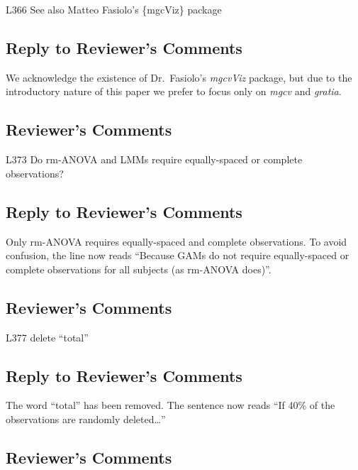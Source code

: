\documentclass[
]{article}
\begin{document}
L366 See also Matteo Fasiolo's \{mgcViz\} package

\hypertarget{section-29}{%
\subsection{\texorpdfstring{\textcolor{reviewersblue} {Reply to Reviewer's Comments}}{}}\label{section-29}}

We acknowledge the existence of Dr.~Fasiolo's \emph{mgcvViz} package, but due to the introductory nature of this paper we prefer to focus only on \emph{mgcv} and \emph{gratia}.

\hypertarget{reviewers-comments-29}{%
\subsection{Reviewer's Comments}\label{reviewers-comments-29}}

L373 Do rm-ANOVA and LMMs require equally-spaced or complete observations?

\hypertarget{section-30}{%
\subsection{\texorpdfstring{\textcolor{reviewersblue} {Reply to Reviewer's Comments}}{}}\label{section-30}}

Only rm-ANOVA requires equally-spaced and complete observations. To avoid confusion, the line now reads ``Because GAMs do not require equally-spaced or complete observations for all subjects (as rm-ANOVA does)''.

\hypertarget{reviewers-comments-30}{%
\subsection{Reviewer's Comments}\label{reviewers-comments-30}}

L377 delete ``total''

\hypertarget{section-31}{%
\subsection{\texorpdfstring{\textcolor{reviewersblue} {Reply to Reviewer's Comments}}{}}\label{section-31}}

The word ``total'' has been removed. The sentence now reads ``If 40\% of the observations are randomly deleted\ldots{}''

\hypertarget{reviewers-comments-31}{%
\subsection{Reviewer's Comments}\label{reviewers-comments-31}}
\end{document}
